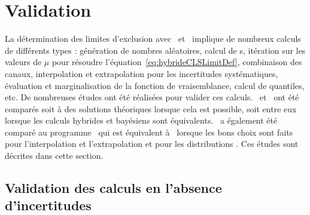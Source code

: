 \section{Validation} 
\label{sec:validationOTH} 

La d\'etermination des limites d'exclusion 
avec \opthylic~et \tifosi~implique de nombreux calculs de diff\'erents types : g\'en\'eration 
de nombres al\'eatoires, calcul de \pval s, it\'eration sur 
les valeurs de $\mu$ pour r\'esoudre l'\'equation~\ref{eq:hybrideCLSLimitDef}, 
combinaison des canaux, interpolation et extrapolation pour les incertitudes 
syst\'ematiques, \'evaluation et marginalisation de la fonction de vraisemblance, calcul de quantiles, etc. 
De nombreuses \'etudes ont \'et\'e r\'ealis\'ees pour valider ces calculs. \opthylic~et \tifosi~ont \'et\'e 
compar\'es soit \`a des solutions th\'eoriques lorsque cela est possible, soit entre eux
lorsque les calculs hybrides et bay\'esiens sont \'equivalents.
\opthylic~a \'egalement \'et\'e compar\'e au programme \mclimit~qui est \'equivalent \`a \opthylic~lorsque les bons choix sont faits pour l'interpolation et l'extrapolation et pour les distributions \prior. 
Ces \'etudes sont d\'ecrites dans cette section.

\subsection{Validation des calculs en l'absence d'incertitudes}

